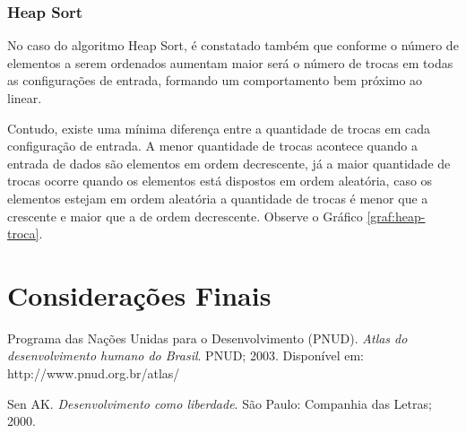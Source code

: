 \documentclass[conference]{IEEEtran}
\begin{document}
\subsubsection{Heap Sort}

No caso do algoritmo Heap Sort, é constatado também que conforme o número de elementos a serem ordenados aumentam maior será o número de trocas em todas as configurações de entrada, formando um comportamento bem próximo ao linear. 

Contudo, existe uma mínima diferença entre a quantidade de trocas em cada configuração de entrada. A menor quantidade de trocas acontece quando a entrada de dados são elementos em ordem decrescente, já a maior quantidade de trocas ocorre quando os elementos está dispostos em ordem aleatória, caso os elementos estejam em ordem aleatória a quantidade de trocas é menor que a crescente e maior que a de ordem decrescente. Observe o Gráfico \ref{graf:heap-troca}.


\section{Considerações Finais}



\begin{thebibliography}{1}


Programa das Nações Unidas para o Desenvolvimento (PNUD). \emph{Atlas do desenvolvimento humano do Brasil}. PNUD; 2003. Disponível em: http://www.pnud.org.br/atlas/

Sen AK. \emph{Desenvolvimento como liberdade}. São Paulo: Companhia das Letras; 2000.


\end{thebibliography}




\end{document}
